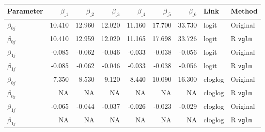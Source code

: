 
\begin{tabular}{lrrrrrrll}
\toprule
Parameter & $\beta_{\_1}$ & $\beta_{\_2}$ & $\beta_{\_3}$ & $\beta_{\_4}$ & $\beta_{\_5}$ & $\beta_{\_6}$ & Link & Method\\
\midrule
$\beta_{0j}$ & 10.410 & 12.960 & 12.020 & 11.160 & 17.700 & 33.730 & logit & Original \citep{candy1991modeling}\\
$\beta_{0j}$ & 10.410 & 12.959 & 12.020 & 11.165 & 17.698 & 33.726 & logit & R \verb+vglm+\\
$\beta_{1j}$ & -0.085 & -0.062 & -0.046 & -0.033 & -0.038 & -0.056 & logit & Original \citep{candy1991modeling}\\
$\beta_{1j}$ & -0.085 & -0.062 & -0.046 & -0.033 & -0.038 & -0.056 & logit & R \verb+vglm+\\
\addlinespace
$\beta_{0j}$ & 7.350 & 8.530 & 9.120 & 8.440 & 10.090 & 16.300 & cloglog & Original \citep{candy1991modeling}\\
$\beta_{0j}$ & NA & NA & NA & NA & NA & NA & cloglog & R \verb+vglm+\\
$\beta_{1j}$ & -0.065 & -0.044 & -0.037 & -0.026 & -0.023 & -0.029 & cloglog & Original \citep{candy1991modeling}\\
$\beta_{1j}$ & NA & NA & NA & NA & NA & NA & cloglog & R \verb+vglm+\\
\bottomrule
\end{tabular}